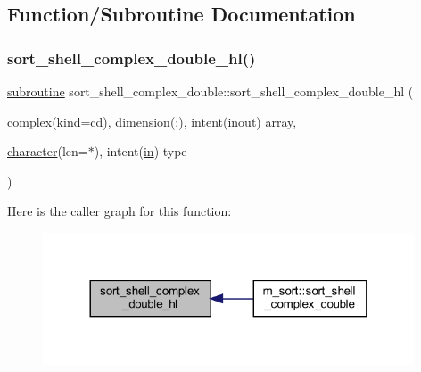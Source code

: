 \subsection{Function/\+Subroutine Documentation}
\mbox{\label{M__sort_8f90_a941eb553497ce355c8c650912f609751}} 
\subsubsection{\texorpdfstring{sort\+\_\+shell\+\_\+complex\+\_\+double\+\_\+hl()}{sort\_shell\_complex\_double\_hl()}}
{\footnotesize\ttfamily \hyperlink{M__stopwatch_83_8txt_acfbcff50169d691ff02d4a123ed70482}{subroutine} sort\+\_\+shell\+\_\+complex\+\_\+double\+::sort\+\_\+shell\+\_\+complex\+\_\+double\+\_\+hl (\begin{DoxyParamCaption}\item[{complex(kind=cd), dimension(\+:), intent(inout)}]{array,  }\item[{\hyperlink{option__stopwatch_83_8txt_abd4b21fbbd175834027b5224bfe97e66}{character}(len=$\ast$), intent(\hyperlink{M__journal_83_8txt_afce72651d1eed785a2132bee863b2f38}{in})}]{type }\end{DoxyParamCaption})\hspace{0.3cm}{\ttfamily [private]}}

Here is the caller graph for this function\+:
\nopagebreak
\begin{figure}[H]
\begin{center}
\leavevmode
\includegraphics[width=312pt]{M__sort_8f90_a941eb553497ce355c8c650912f609751_icgraph}
\end{center}
\end{figure}
\mbox{\label{M__sort_8f90_a2910d11c802e6658c33f26b2300a7f90}} 
